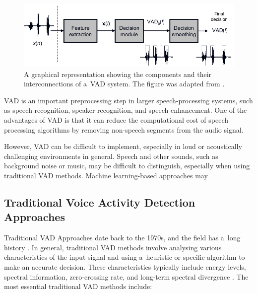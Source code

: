     \begin{figure}[ht!]
        \centering
        \includegraphics[width = \textwidth]{obrazky-figures/VAD_diagram.png}
        \caption{A graphical representation showing the components and their interconnections of a~VAD system.  The figure was adapted from \cite{Ramirez07}.}
        \label{fig:VAD_diagram}
    \end{figure}
    
VAD is an important preprocessing step in larger speech-processing systems, such as speech recognition, speaker recognition, and speech enhancement. One of the advantages of VAD is that it can reduce the computational cost of speech processing algorithms by removing non-speech segments from the audio signal.

However, VAD can be difficult to implement, especially in loud or acoustically challenging environments in general. Speech and other sounds, such as background noise or music, may be difficult to distinguish, especially when using traditional VAD methods. Machine learning-based approaches may 


\subsection{Traditional Voice Activity Detection Approaches}\label{traditional}

Traditional VAD Approaches date back to the 1970s, and the field has a~long history \cite{Adlin21}. In general, traditional VAD methods involve analysing various characteristics of the input signal and using a~heuristic or specific algorithm to make an accurate decision. These characteristics typically include energy levels, spectral information, zero-crossing rate, and long-term spectral divergence \cite{tanyer2000voice, aaltovad}. The most essential traditional VAD methods include:

